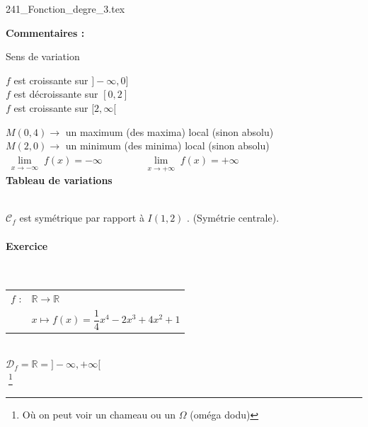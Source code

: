 \vspace*{-2cm}
\centerline{ {241_Fonction_degre_3.tex} }

\textbf{Commentaires :}

 Sens de variation 

$f$ est croissante sur $]- \infty, 0]$ \\
$f$ est décroissante sur $[0, 2]$ \\
$f$ est croissante sur $[2, \infty[$ \\

\smallskip 

$M(0,4) \longrightarrow $ un maximum (des maxima) local (sinon absolu) \\
$M(2,0) \longrightarrow $ un minimum (des minima) local (sinon absolu)\\

$\lim\limits_{\substack{x \to -\infty}} f(x) = -\infty \qquad \qquad \lim\limits_{\substack{x \to +\infty}} f(x) = +\infty $ \\


\textbf{Tableau de variations}\\

\\

$\mathscr{C}_f$ est symétrique par rapport à $I(1,2)$ . (Symétrie centrale). 

\newpage

\paragraph{Exercice }~\\

\begin{tabular}{l@{$\;$ }l}
 $f$ : & $ \mathbb{R} \longrightarrow \mathbb{R}$\\
       & $ x \longmapsto f(x) = \dfrac{1}{4}x^4 -2x^3 +4x^2 +1$ 
\end{tabular}\\

$\mathscr{D}_f = \mathbb{R} = ] -\infty, +\infty [ $ \\

\vspace{1cm}
\hspace*{7.5cm}$\;$\footnote{Où on peut voir un chameau ou un $\Omega$ (oméga dodu)}

